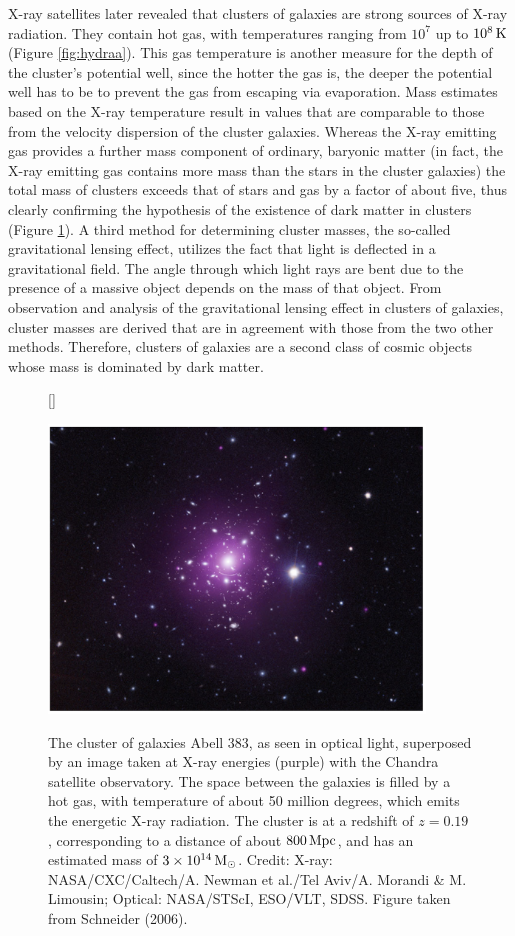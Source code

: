 \documentclass[a4paper,10pt]{article}
\begin{document}
{\noindent}X-ray satellites later revealed that clusters of galaxies are strong sources of X-ray radiation. They contain hot gas, with temperatures ranging from $10^7$ up to $10^8\,{\rm K}$ (Figure \ref{fig:hydraa}). This gas temperature is another measure for the depth of the cluster's potential well, since the hotter the gas is, the deeper the potential well has to be to prevent the gas from escaping via evaporation. Mass estimates based on the X-ray temperature result in values that are comparable to those from the velocity dispersion of the cluster galaxies. Whereas the X-ray emitting gas provides a further mass component of ordinary, baryonic matter (in fact, the X-ray emitting gas contains more mass than the stars in the cluster galaxies) the total mass of clusters exceeds that of stars and gas by a factor of about five, thus clearly confirming the hypothesis of the existence of dark matter in clusters (Figure \ref{fig:abell383}). A third method for determining cluster masses, the so-called gravitational lensing effect, utilizes the fact that light is deflected in a gravitational field. The angle through which light rays are bent due to the presence of a massive object depends on the mass of that object. From observation and analysis of the gravitational lensing effect in clusters of galaxies, cluster masses are derived that are in agreement with those from the two other methods. Therefore, clusters of galaxies are a second class of cosmic objects whose mass is dominated by dark matter.

\begin{figure}[h]
    [\FBwidth]
    {\caption{\footnotesize{The cluster of galaxies Abell 383, as seen in optical light, superposed by an image taken at X-ray energies (purple) with the Chandra satellite observatory. The space between the galaxies is filled by a hot gas, with temperature of about 50 million degrees, which emits the energetic X-ray radiation. The cluster is at a redshift of $z=0.19$, corresponding to a distance of about $800\,{\rm Mpc}$, and has an estimated mass of $3\times10^{14}\,{\rm M_\odot}$. Credit: X-ray: NASA/CXC/Caltech/A. Newman et al./Tel Aviv/A. Morandi \& M. Limousin; Optical: NASA/STScI, ESO/VLT, SDSS. Figure taken from Schneider (2006).}}
    \label{fig:abell383}}
    {\includegraphics[width=10cm]{figures/Abell383.png}}
\end{figure}
\end{document}
